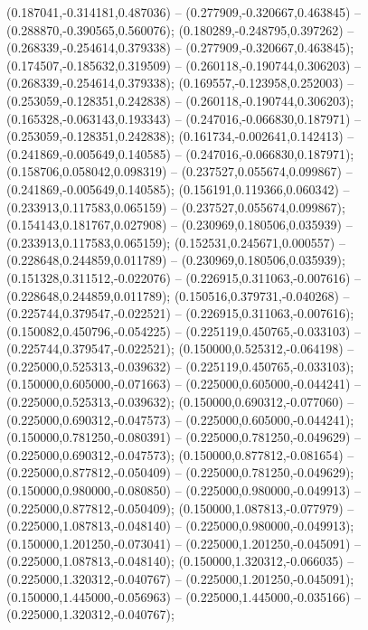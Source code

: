  (0.187041,-0.314181,0.487036) -- (0.277909,-0.320667,0.463845) -- (0.288870,-0.390565,0.560076);
 (0.180289,-0.248795,0.397262) -- (0.268339,-0.254614,0.379338) -- (0.277909,-0.320667,0.463845);
 (0.174507,-0.185632,0.319509) -- (0.260118,-0.190744,0.306203) -- (0.268339,-0.254614,0.379338);
 (0.169557,-0.123958,0.252003) -- (0.253059,-0.128351,0.242838) -- (0.260118,-0.190744,0.306203);
 (0.165328,-0.063143,0.193343) -- (0.247016,-0.066830,0.187971) -- (0.253059,-0.128351,0.242838);
 (0.161734,-0.002641,0.142413) -- (0.241869,-0.005649,0.140585) -- (0.247016,-0.066830,0.187971);
 (0.158706,0.058042,0.098319) -- (0.237527,0.055674,0.099867) -- (0.241869,-0.005649,0.140585);
 (0.156191,0.119366,0.060342) -- (0.233913,0.117583,0.065159) -- (0.237527,0.055674,0.099867);
 (0.154143,0.181767,0.027908) -- (0.230969,0.180506,0.035939) -- (0.233913,0.117583,0.065159);
 (0.152531,0.245671,0.000557) -- (0.228648,0.244859,0.011789) -- (0.230969,0.180506,0.035939);
 (0.151328,0.311512,-0.022076) -- (0.226915,0.311063,-0.007616) -- (0.228648,0.244859,0.011789);
 (0.150516,0.379731,-0.040268) -- (0.225744,0.379547,-0.022521) -- (0.226915,0.311063,-0.007616);
 (0.150082,0.450796,-0.054225) -- (0.225119,0.450765,-0.033103) -- (0.225744,0.379547,-0.022521);
 (0.150000,0.525312,-0.064198) -- (0.225000,0.525313,-0.039632) -- (0.225119,0.450765,-0.033103);
 (0.150000,0.605000,-0.071663) -- (0.225000,0.605000,-0.044241) -- (0.225000,0.525313,-0.039632);
 (0.150000,0.690312,-0.077060) -- (0.225000,0.690312,-0.047573) -- (0.225000,0.605000,-0.044241);
 (0.150000,0.781250,-0.080391) -- (0.225000,0.781250,-0.049629) -- (0.225000,0.690312,-0.047573);
 (0.150000,0.877812,-0.081654) -- (0.225000,0.877812,-0.050409) -- (0.225000,0.781250,-0.049629);
 (0.150000,0.980000,-0.080850) -- (0.225000,0.980000,-0.049913) -- (0.225000,0.877812,-0.050409);
 (0.150000,1.087813,-0.077979) -- (0.225000,1.087813,-0.048140) -- (0.225000,0.980000,-0.049913);
 (0.150000,1.201250,-0.073041) -- (0.225000,1.201250,-0.045091) -- (0.225000,1.087813,-0.048140);
 (0.150000,1.320312,-0.066035) -- (0.225000,1.320312,-0.040767) -- (0.225000,1.201250,-0.045091);
 (0.150000,1.445000,-0.056963) -- (0.225000,1.445000,-0.035166) -- (0.225000,1.320312,-0.040767);

